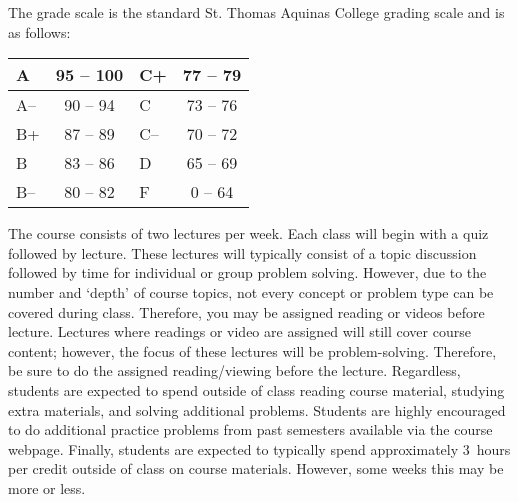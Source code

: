 \documentclass[11pt,letterpaper]{article}
\begin{document}
The grade scale is the standard St. Thomas Aquinas College grading scale and is as follows: \par
        \begin{table}[!ht]
        \centering
        \begin{tabular}{|l||c|l||c|} \hline
        A & 95 -- 100 & C+ & 77 -- 79 \\ \hline
        A-- & 90 -- 94 & C & 73 -- 76 \\ \hline
        B+ & 87 -- 89 & C-- & 70 -- 72 \\ \hline
        B & 83 -- 86 & D & 65 -- 69 \\ \hline
        B-- & 80 -- 82 & F & 0 -- 64 \\ \hline
        \end{tabular}
        \end{table}
\sectionbreak





\newpage





The course consists of two lectures per week. Each class will begin with a quiz followed by lecture. These lectures will typically consist of a topic discussion followed by time for individual or group problem solving. However, due to the number and `depth' of course topics, not every concept or problem type can be covered during class. Therefore, you may be assigned reading or videos before lecture. Lectures where readings or video are assigned will still cover course content; however, the focus of these lectures will be problem-solving. Therefore, be sure to do the assigned reading/viewing before the lecture. Regardless, students are expected to spend outside of class reading course material, studying extra materials, and solving additional problems. Students are highly encouraged to do additional practice problems from past semesters available via the course webpage. Finally, students are expected to typically spend approximately 3~hours per credit outside of class on course materials. However, some weeks this may be more or less. \pspace
\end{document}
